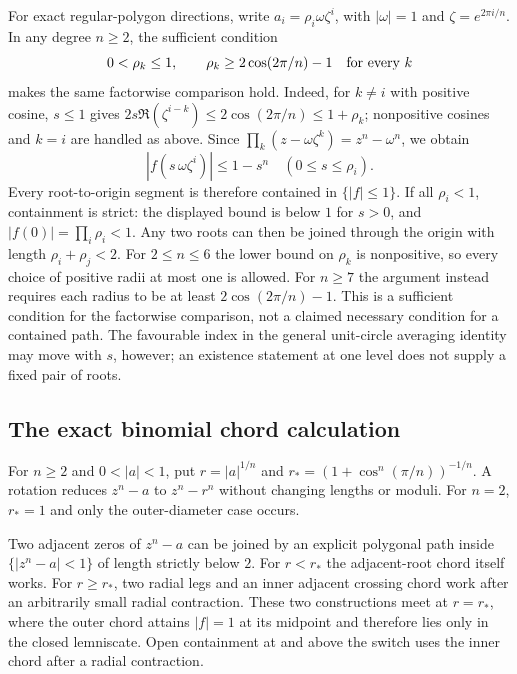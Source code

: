 \documentclass[11pt]{article}
\begin{document}
For exact regular-polygon directions, write
$a_i=\rho_i\omega\zeta^i$, with $|\omega|=1$ and
$\zeta=e^{2\pi i/n}$. In any degree $n\ge2$, the sufficient condition
\[
 0<\rho_k\le1,\qquad \rho_k\ge2\cos(2\pi/n)-1\quad\hbox{for every }k
\]
makes the same factorwise comparison hold. Indeed, for $k\ne i$ with
positive cosine, $s\le1$ gives
$2s\Re(\zeta^{i-k})\le2\cos(2\pi/n)\le1+\rho_k$;
nonpositive cosines and $k=i$ are handled as above. Since
$\prod_k(z-\omega\zeta^k)=z^n-\omega^n$, we obtain
\[
 |f(s\,\omega\zeta^i)|\le1-s^n
 \quad(0\le s\le\rho_i).
\]
Every root-to-origin segment is therefore contained in $\{|f|\le1\}$.
If all $\rho_i<1$, containment is strict: the displayed bound is below
$1$ for $s>0$, and $|f(0)|=\prod_i\rho_i<1$. Any two roots can then
be joined through the origin with length $\rho_i+\rho_j<2$.
For $2\le n\le6$ the lower bound on $\rho_k$ is nonpositive,
so every choice of positive radii at most one is allowed. For $n\ge7$
the argument instead requires each radius to be at least
$2\cos(2\pi/n)-1$. This is a sufficient condition for the factorwise
comparison, not a claimed necessary condition for a contained path.
The favourable index in the general unit-circle averaging identity may
move with $s$, however; an existence statement at one level does not
supply a fixed pair of roots.

\subsection*{The exact binomial chord calculation}
\hypertarget{binomial-chord-calculation}{}
For $n\ge2$ and $0<|a|<1$, put $r=|a|^{1/n}$ and
$r_*=(1+\cos^n(\pi/n))^{-1/n}$. A rotation reduces $z^n-a$ to
$z^n-r^n$ without changing lengths or moduli. For $n=2$, $r_*=1$
and only the outer-diameter case occurs.

\begin{theorem}\label{res:complementary-binomial-chords}
Two adjacent zeros of $z^n-a$ can be joined by an explicit polygonal path
inside $\{|z^n-a|<1\}$ of length strictly below $2$.  For $r<r_*$ the
adjacent-root chord itself works.  For $r\ge r_*$, two radial legs and an
inner adjacent crossing chord work after an arbitrarily small radial
contraction.  These two constructions meet at $r=r_*$, where the outer chord attains
$|f|=1$ at its midpoint and therefore lies only in the closed lemniscate.
Open containment at and above the switch uses the inner chord
after a radial contraction.
\end{theorem}
\end{document}
